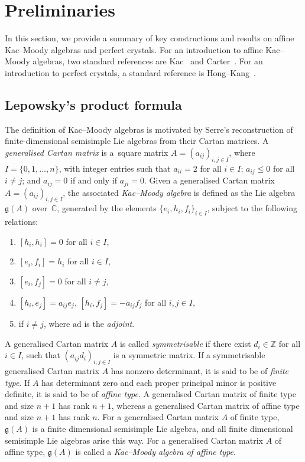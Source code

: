 \documentclass[10pt,a4paper]{amsart}
\numberwithin{equation}{section}
\theoremstyle{definition}
\newcommand{\Z}{\mathbb{Z}}
\begin{document}
\section{Preliminaries} \label{section:preliminaries}

In this section, we provide a summary of key constructions and results on affine Kac--Moody algebras and perfect crystals. For an introduction to affine Kac--Moody algebras, two standard references are Kac~\cite{Kac90} and Carter~\cite{Car10}. For an introduction to perfect crystals, a standard reference is Hong--Kang~\cite[Chapter~10]{HK02}.

\subsection{Lepowsky's product formula}

The definition of Kac--Moody algebras is motivated by Serre's reconstruction of finite-dimen\-sional semisimple Lie algebras from their Cartan matrices. A \emph{generalised Cartan matrix} is a~square matrix $A = (a_{ij})_{i,j \in I}$, where $I = \{0, 1, \ldots, n\}$, with integer entries such that $a_{ii} = 2$ for all $i \in I$; $a_{ij} \leq 0$ for all $i \neq j$; and $a_{ij} = 0$ if and only if $a_{ji} = 0$. Given a generalised Cartan matrix $A = (a_{ij})_{i,j \in I}$, the associated \emph{Kac--Moody algebra} is defined as the Lie algebra~$\mathfrak{g}(A)$ over~$\mathbb{C}$, generated by the elements $\{e_i, h_i, f_i\}_{i \in I}$, subject to the following relations:
\begin{enumerate}[label=(\roman*)]\itemsep=0pt
 \item $[h_i,h_i] =0$ for all $i \in I$,
 \item $[e_i,f_i] =h_i$ for all $i \in I$,
 \item $[e_i,f_j] =0$ for all $i \neq j$,
 \item $[h_i,e_j] =a_{ij}e_j$, $[h_i,f_j] =-a_{ij}f_j$ for all $i,j \in I$,
 \item {} if $i \neq j$, where $\mathrm{ad}$ is the \textit{adjoint}.
\end{enumerate}

A generalised Cartan matrix $A$ is called \emph{symmetrisable} if there exist $d_i \in \Z$ for all $i \in I$, such that $(a_{ij}d_i)_{i,j \in I}$ is a symmetric matrix. If a symmetrisable generalised Cartan matrix $A$ has nonzero determinant, it is said to be of \emph{finite type}. If $A$ has determinant zero and each proper principal minor is positive definite, it is said to be of \emph{affine type}. A generalised Cartan matrix of finite type and size $n+1$ has rank $n+1$, whereas a generalised Cartan matrix of affine type and size $n+1$ has rank $n$. For a generalised Cartan matrix $A$ of finite type, $\mathfrak{g}(A)$ is a finite dimensional semisimple Lie algebra, and all finite dimensional semisimple Lie algebras arise this way. For a generalised Cartan matrix $A$ of affine type, $\mathfrak{g}(A)$ is called a \emph{Kac--Moody algebra of affine type}.
\end{document}
